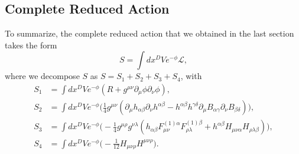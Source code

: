 \documentclass{article}
\begin{document}
\subsection{Complete Reduced Action}
To summarize, the complete reduced action that we obtained in the last section takes the form
\begin{equation}
    S =  \int dx^D Ve^{-\phi} \mathcal{L},
\end{equation}
where we decompose $S$ as $S =  S_1 + S_2 + S_3 +S_4$, with
\begin{equation} \label{eq:38}
    \boxed{
    \begin{aligned}
        S_1 &=\int dx^D Ve^{-\phi}(R +g^{\mu \nu}\partial_{\mu }\phi \partial_{\nu} \phi),\\
        S_2 &=\int dx^D Ve^{-\phi}\Big(\frac{1}{4}g^{\mu \nu }(\partial_\mu h_{\alpha \beta}\partial_\nu h^{\alpha \beta} - h^{\alpha \beta } h^{\gamma \delta}\partial_\mu B_{\alpha \gamma} \partial_\nu B_{\beta \delta})\Big),\\
        S_3 &= \int dx^DVe^{-\phi}\Big(-\frac{1}{4}g^{\mu \rho}g^{\nu \lambda}(h_{\alpha\beta}F^{(1)\alpha}_{\mu \nu}F^{(1)\beta}_{\rho \lambda}+h^{\alpha \beta}H_{\mu \nu \alpha}H_{\rho \lambda \beta })\Big),\\
        S_4 &=\int dx^D Ve^{-\phi}\Big(-\frac{1}{12}H_{\mu \nu \rho} H^{\mu \nu \rho}\Big).
    \end{aligned}}
\end{equation}
\end{document}
